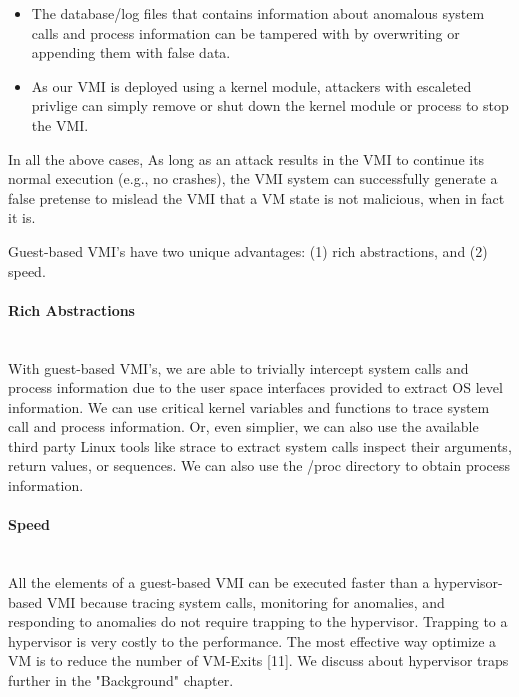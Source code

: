 \documentclass{report}
\begin{document}
\begin{spacing}{1.5}
{\begin{itemize}
\item The database/log files that contains information about anomalous system calls and process information can be tampered with by overwriting or appending them with false data. 


\item As our VMI is deployed using a kernel module, attackers with escaleted privlige can simply remove or shut down the kernel module or process to stop the VMI.
\end{itemize}
}

{\large
In all the above cases, As long as an attack results in the VMI to continue its normal execution (e.g., no crashes), the VMI system can successfully generate a false pretense to mislead the VMI that a VM state is not malicious, when in fact it is.
\newline
}


{\large
Guest-based VMI's have two unique advantages: (1) rich abstractions, and (2) speed. 
\newline
}

\paragraph{Rich Abstractions}\mbox{}\\

{\large
With guest-based VMI's, we are able to trivially intercept system calls and process information due to the user space interfaces provided to extract OS level information. We can use critical kernel variables and functions to trace system call and process information. Or, even simplier, we can also use the available third party Linux tools like strace to extract system calls inspect their arguments, return values, or sequences. We can also use the /proc directory to obtain process information.
\newline
}

\paragraph{Speed}\mbox{}\\

{\large
All the elements of a guest-based VMI can be executed faster than a hypervisor-based VMI because tracing system calls, monitoring for anomalies, and responding to anomalies do not require trapping to the hypervisor. Trapping to a hypervisor is very costly to the performance. The most effective way optimize a VM is to reduce the number of VM-Exits [11]. We discuss about hypervisor traps further in the "Background" chapter. 
\newline
}


\end{spacing}
\end{document}
